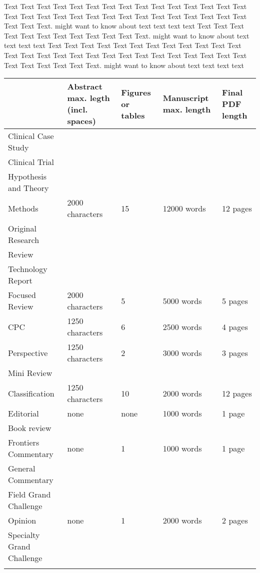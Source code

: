 \documentclass{frontiersMED} %
\begin{document}
Text Text Text Text Text Text  Text Text Text Text Text Text Text Text Text  Text Text Text Text Text Text Text Text Text Text  Text Text Text Text Text Text  Text Text.  \cite{Neuro2013} might want to know about  text text text text Text Text Text Text  Text Text Text Text Text Text  Text Text. \citep{Gene2012} might want to know about  text text text text
Text Text Text Text Text Text  Text Text Text Text Text Text Text Text Text  Text Text Text Text Text Text Text Text Text Text  Text Text Text Text Text Text  Text Text.  \cite{Neurobot2013} might want to know about  text text text text

\begin{table}[!t]
{\begin{tabular}{lllll}\toprule
 & Abstract max. legth (incl. spaces) & Figures or tables & Manuscript max. length & Final PDF length\\\midrule
Clinical Case Study & & & &\\
Clinical Trial & & & &\\
Hypothesis and Theory & & & &\\
Methods & 2000 characters  & 15 & 12000 words & 12 pages\\
Original Research & & & &\\
Review & & & &\\
Technology Report & & & &\\
Focused Review & 2000 characters & 5 & 5000 words & 5 pages\\
CPC &  1250 characters& 6 & 2500 words & 4 pages\\
Perspective & 1250 characters & 2 & 3000 words & 3 pages\\
Mini Review & & & &\\
Classification & 1250 characters & 10 & 2000 words & 12 pages\\
Editorial & none & none & 1000 words & 1 page \\
Book review & & & &\\
Frontiers Commentary & none & 1 & 1000 words & 1 page\\
General Commentary & & & &\\
Field Grand Challenge & & & &\\
Opinion & none & 1 & 2000 words & 2 pages\\
Specialty Grand Challenge& & & &\\\botrule
\end{tabular}}{}
\end{table}
\end{document}
